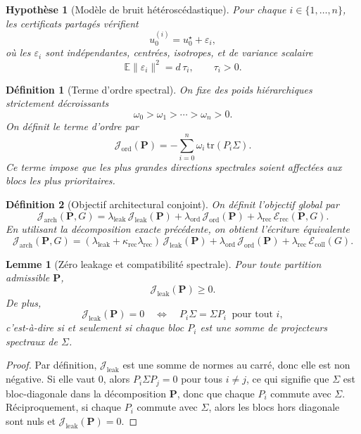 \documentclass[11pt,a4paper]{article}
\newtheorem{definition}{Définition}[section]
\newtheorem{assumption}{Hypothèse}[section]
\newtheorem{lemma}{Lemme}[section]
\newcommand{\1}{\mathbf 1}
\begin{document}
\begin{assumption}[Modèle de bruit hétéroscédastique]
Pour chaque \(i\in\{1,\dots,n\}\), les certificats partagés vérifient
\[
u_0^{(i)}=u_0^\star+\varepsilon_i,
\]
où les \(\varepsilon_i\) sont indépendantes, centrées, isotropes, et de variance scalaire
\[
\mathbb E\|\varepsilon_i\|^2=d\,\tau_i,
\qquad \tau_i>0.
\]
\end{assumption}

\begin{definition}[Terme d'ordre spectral]
On fixe des poids hiérarchiques strictement décroissants
\[
\omega_0>\omega_1>\cdots>\omega_n>0.
\]
On définit le terme d'ordre par
\[
\mathcal J_{\mathrm{ord}}(\mathbf P)
=
-\sum_{i=0}^n \omega_i\,\mathrm{tr}(P_i\Sigma).
\]
Ce terme impose que les plus grandes directions spectrales soient affectées aux blocs les plus prioritaires.
\end{definition}

\begin{definition}[Objectif architectural conjoint]
On définit l'objectif global par
\[
\mathcal J_{\mathrm{arch}}(\mathbf P,G)
=
\lambda_{\mathrm{leak}}\,\mathcal J_{\mathrm{leak}}(\mathbf P)
+
\lambda_{\mathrm{ord}}\,\mathcal J_{\mathrm{ord}}(\mathbf P)
+
\lambda_{\mathrm{rec}}\,\mathcal E_{\mathrm{rec}}(\mathbf P,G).
\]
En utilisant la décomposition exacte précédente, on obtient l'écriture équivalente
\[
\mathcal J_{\mathrm{arch}}(\mathbf P,G)
=
(\lambda_{\mathrm{leak}}+\kappa_{\mathrm{rec}}\lambda_{\mathrm{rec}})\,
\mathcal J_{\mathrm{leak}}(\mathbf P)
+
\lambda_{\mathrm{ord}}\,\mathcal J_{\mathrm{ord}}(\mathbf P)
+
\lambda_{\mathrm{rec}}\,\mathcal E_{\mathrm{coll}}(G).
\]
\end{definition}

\begin{lemma}[Zéro leakage et compatibilité spectrale]
Pour toute partition admissible \(\mathbf P\),
\[
\mathcal J_{\mathrm{leak}}(\mathbf P)\ge 0.
\]
De plus,
\[
\mathcal J_{\mathrm{leak}}(\mathbf P)=0
\quad\Longleftrightarrow\quad
P_i\Sigma=\Sigma P_i
\ \text{ pour tout } i,
\]
c'est-à-dire si et seulement si chaque bloc \(P_i\) est une somme de projecteurs spectraux de \(\Sigma\).
\end{lemma}

\begin{proof}
Par définition, \(\mathcal J_{\mathrm{leak}}\) est une somme de normes au carré, donc elle est non négative.
Si elle vaut \(0\), alors \(P_i\Sigma P_j=0\) pour tous \(i\neq j\), ce qui signifie que \(\Sigma\) est bloc-diagonale dans la décomposition \(\mathbf P\), donc que chaque \(P_i\) commute avec \(\Sigma\).
Réciproquement, si chaque \(P_i\) commute avec \(\Sigma\), alors les blocs hors diagonale sont nuls et \(\mathcal J_{\mathrm{leak}}(\mathbf P)=0\).
\end{proof}
\end{document}
